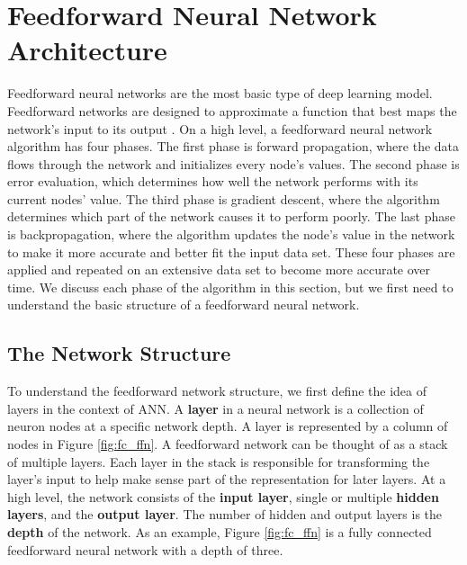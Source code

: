 \section{Feedforward Neural Network Architecture} \label{sec:feedforward_nn}

Feedforward neural networks are the most basic type of deep learning model. Feedforward networks are designed to approximate a function that best maps the network's input to its output \cite{lecun2015deep}. On a high level, a feedforward neural network algorithm has four phases. The first phase is forward propagation, where the data flows through the network and initializes every node's values. The second phase is error evaluation, which determines how well the network performs with its current nodes' value. The third phase is gradient descent, where the algorithm determines which part of the network causes it to perform poorly. The last phase is backpropagation, where the algorithm updates the node's value in the network to make it more accurate and better fit the input data set. These four phases are applied and repeated on an extensive data set to become more accurate over time. We discuss each phase of the algorithm in this section, but we first need to understand the basic structure of a feedforward neural network.

\subsection{The Network Structure \label{network_structure}}
To understand the feedforward network structure, we first define the idea of layers in the context of ANN. A \textbf{layer} in a neural network is a collection of neuron nodes at a specific network depth. A layer is represented by a column of nodes in Figure \ref{fig:fc_ffn}. A feedforward network can be thought of as a stack of multiple layers. Each layer in the stack is responsible for transforming the layer's input to help make sense part of the representation for later layers. At a high level, the network consists of the \textbf{input layer}, single or multiple \textbf{hidden layers}, and the \textbf{output layer}. The number of hidden and output layers is the \textbf{depth} of the network. As an example, Figure \ref{fig:fc_ffn} is a fully connected feedforward neural network with a depth of three.


